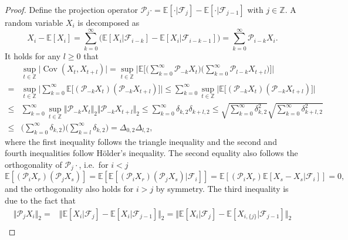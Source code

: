 \documentclass[11pt]{article}
\DeclareMathOperator*{\cov}{Cov}
\theoremstyle{plain}
\theoremstyle{definition}
\begin{document}
\begin{proof}
    Define the projection operator $\mathcal{P}_j\cdot = \mathbb{E}[\cdot|\mathcal{F}_j] - \mathbb{E}[\cdot| \mathcal{F}_{j-1}]$ with $j \in \mathbb{Z}$.  A random variable $X_i$ is decomposed as
    \begin{equation*}
        X_i - \mathbb{E}[X_i] = \sum_{k = 0}^{\infty}\big(\mathbb{E}[X_i|\mathcal{F}_{i-k}] - \mathbb{E}[X_i| \mathcal{F}_{i-k-1}]\big) = \sum_{k = 0}^{\infty}\mathcal{P}_{i-k}X_i.
    \end{equation*}
    It holds for any $l \geq 0$ that 
    \begin{equation*}
    \begin{aligned}
        &\sup_{t \in \mathbb{Z}}\big|\cov(X_{t}, X_{t+l})\big| = \sup_{t \in \mathbb{Z}}\bigg|\mathbb{E}\Big[\Big(\sum_{k = 0}^{\infty}\mathcal{P}_{-k}X_t\Big)\Big(\sum_{k = 0}^{\infty}\mathcal{P}_{l-k}X_{t+l}\Big)\Big]\bigg|\\
        =& \sup_{t \in \mathbb{Z}}\bigg|\sum_{k =     0}^{\infty}\mathbb{E}\big[(\mathcal{P}_{-k}X_t)(\mathcal{P}_{-k}X_{t+l})\big]\bigg| \leq \sum_{k =     0}^{\infty}\sup_{t \in \mathbb{Z}}\Big|\mathbb{E}\big[(\mathcal{P}_{-k}X_t)(\mathcal{P}_{-k}X_{t+l})\big]\Big|\\
        \leq& \sum_{k = 0}^{\infty}\sup_{t \in \mathbb{Z}}\Vert \mathcal{P}_{-k}X_{t} \Vert_2 \Vert \mathcal{P}_{-k}X_{t+l}\Vert_2 \leq \sum_{k = 0}^{\infty} \delta_{k,2}\delta_{k+l,2} \leq \sqrt{\sum_{k = 0}^{\infty} \delta_{k,2}^2}\sqrt{\sum_{k = 0}^{\infty} \delta_{k+l,2}^2}\\
        \leq& \Big(\sum_{k = 0}^{\infty} \delta_{k,2}\Big) \Big(\sum_{k = l}^{\infty} \delta_{k,2}\Big) = \Delta_{0,2}\Delta_{l,2},
    \end{aligned}
    \end{equation*}
    where the first inequality follows the triangle inequality and the second and fourth inequalities follow H\"older's inequality. The second equality also follows the orthogonality of $\mathcal{P}_j\cdot$, i.e.~for $i < j$
    \begin{equation*}
        \mathbb{E}[(\mathcal{P}_iX_r)(\mathcal{P}_jX_s)] = \mathbb{E}[\mathbb{E}[(\mathcal{P}_iX_r)(\mathcal{P}_jX_s)|\mathcal{F}_{i}]] = \mathbb{E}[(\mathcal{P}_iX_r)\mathbb{E}[X_s-X_s|\mathcal{F}_i]] = 0,
    \end{equation*}
    and the orthogonality also holds for $i > j$ by symmetry. The third inequality is due to the fact that
    \begin{align*}
        \Vert \mathcal{P}_{j}X_i \Vert_2 =& \Vert \mathbb{E}[X_i| \mathcal{F}_{j}] - \mathbb{E}[X_i| \mathcal{F}_{j-1}]\Vert_2 = \Vert\mathbb{E}[X_i| \mathcal{F}_{j}] - \mathbb{E}[X_{i,\{j\}}| \mathcal{F}_{j-1}]\Vert_2\\

\end{align*}
\end{proof}
\end{document}
